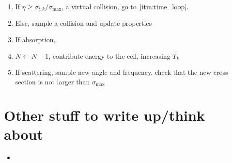 \documentclass{article}
\begin{document}
\begin{enumerate}
\begin{enumerate}
    \item If $\eta \geq \sigma_{t,k}/\sigma_{\max}$, a virtual collision, go
to~\ref{itm:time_loop}.
    \item Else, sample a collision and update properties 
    \item If absorption, \item $N\leftarrow N-1$, contribute energy to the cell, increasing $T_k$
    \item If scattering, sample new angle and frequency, check that the new cross
           section is not larger than $\sigma_{\max}$
\end{enumerate}
\end{enumerate}
 
\section{Other stuff to write up/think about}

\begin{itemize}
 \item
\end{itemize}




\end{document}
